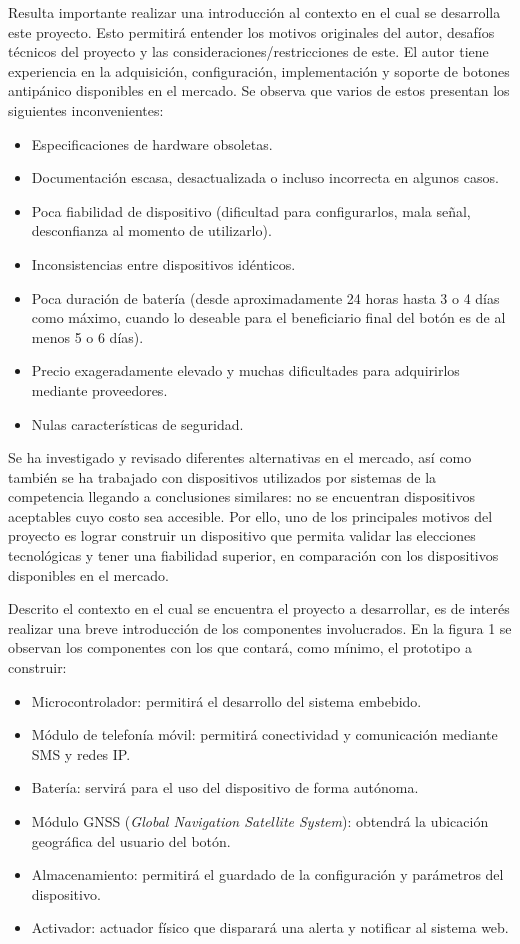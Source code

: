 \documentclass[
11pt, %
]{charter}
\begin{document}
Resulta importante realizar una introducción al contexto en el cual se desarrolla este proyecto. Esto permitirá entender los motivos originales del autor, desafíos técnicos del proyecto y las consideraciones/restricciones de este.
El autor tiene experiencia en la adquisición, configuración, implementación y soporte de botones antipánico disponibles en el mercado. Se observa que varios de estos presentan los siguientes inconvenientes:
\begin{itemize}
	\item Especificaciones de hardware obsoletas.
	\item Documentación escasa, desactualizada o incluso incorrecta en algunos casos.
	\item Poca fiabilidad de dispositivo (dificultad para configurarlos, mala señal, desconfianza al momento de utilizarlo).
	\item Inconsistencias entre dispositivos idénticos.
	\item Poca duración de batería (desde aproximadamente 24 horas hasta 3 o 4 días como máximo, cuando lo deseable para el beneficiario final del botón es de al menos 5 o 6 días).
	\item Precio exageradamente elevado y muchas dificultades para adquirirlos mediante proveedores.
	\item Nulas características de seguridad.
\end{itemize}

Se ha investigado y revisado diferentes alternativas en el mercado, así como también se ha trabajado con dispositivos utilizados por sistemas de la competencia llegando a conclusiones similares: no se encuentran dispositivos aceptables cuyo costo sea accesible. 
Por ello, uno de los principales motivos del proyecto es lograr construir un dispositivo que permita validar las elecciones tecnológicas y tener una fiabilidad superior, en comparación con los dispositivos disponibles en el mercado.

Descrito el contexto en el cual se encuentra el proyecto a desarrollar, es de interés realizar una breve introducción de los componentes involucrados. En la figura 1 se observan los componentes con los que contará, como mínimo, el prototipo a construir:
\begin{itemize}
	\item Microcontrolador: permitirá el desarrollo del sistema embebido.
	\item Módulo de telefonía móvil: permitirá conectividad y comunicación mediante SMS y redes IP.
	\item Batería: servirá para el uso del dispositivo de forma autónoma.
	\item Módulo GNSS (\textit{Global Navigation Satellite System}): obtendrá la ubicación geográfica del usuario del botón.
	\item Almacenamiento: permitirá el guardado de la configuración y parámetros del dispositivo.
	\item Activador: actuador físico que disparará una alerta y notificar al sistema web.
\end{itemize}
\end{document}
